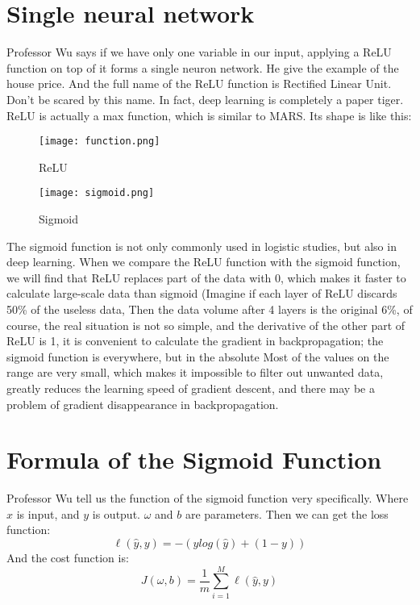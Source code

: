 \documentclass[a4paper]{article}
\begin{document}
\section{Single neural network}
Professor Wu says if we have only one variable in our input, applying a ReLU function on top of it forms a single neuron network. He give the example of the house price. And the full name of the ReLU function is Rectified Linear Unit. Don't be scared by this name. In fact, deep learning is completely a paper tiger. ReLU is actually a max function, which is similar to MARS. Its shape is like this:
\begin{figure}[!htb]
 \centering
 \texttt{[image: function.png]}\\
 \caption{ReLU}
 \end{figure}
  \begin{figure}[!htb]
 \centering
 \texttt{[image: sigmoid.png]}\\
 \caption{Sigmoid}
 \end{figure}
The sigmoid function is not only commonly used in logistic studies, but also in deep learning. When we compare the ReLU function with the sigmoid function, we will find that ReLU replaces part of the data with 0, which makes it faster to calculate large-scale data than sigmoid (Imagine if each layer of ReLU discards 50\% of the useless data, Then the data volume after 4 layers is the original 6\%, of course, the real situation is not so simple, and the derivative of the other part of ReLU is 1, it is convenient to calculate the gradient in backpropagation; the sigmoid function is everywhere, but in the absolute Most of the values on the range are very small, which makes it impossible to filter out unwanted data, greatly reduces the learning speed of gradient descent, and there may be a problem of gradient disappearance in backpropagation.
 \section{Formula of the Sigmoid Function}
 Professor Wu tell us the function of the sigmoid function very specifically. Where $x$ is input, and $y$ is output. $\omega$ and $b$ are parameters. Then we can get the loss function:
 \begin{equation}
 \ell(\hat{y},y)=-(ylog(\hat{y})+(1-y))
 \end{equation}
 And the cost function is:
 \begin{equation}
 J(\omega,b)=\frac{1}{m}\sum_{i=1}^{M}\ell(\hat{y},y)
 \end{equation}
\end{document}
